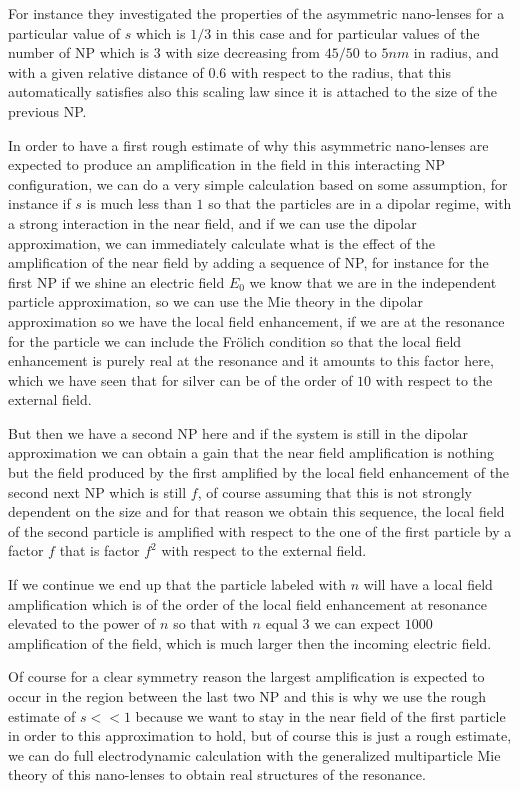 \documentclass[../main/main.tex]{subfiles}
\begin{document}
For instance they investigated the properties of the asymmetric nano-lenses for a particular value of $s$ which is $1/3$ in this case and for particular values of the number of NP which is $3$ with size decreasing from $45/50$ to $5 nm$ in radius, and with a given relative distance of $0.6$ with respect to the radius, that this automatically satisfies also this scaling law since it is attached to the size of the previous NP.

In order to have a first rough estimate of why this asymmetric nano-lenses are expected to produce an amplification in the field in this interacting NP configuration, we can do a very simple calculation based on some assumption, for instance if $s$ is much less than $1$ so that the particles are in a dipolar regime, with a strong interaction in the near field, and if we can use the dipolar approximation, we can immediately calculate what is the effect of the amplification of the near field by adding a sequence of NP, for instance for the first NP if we shine an electric field $E_0$ we know that we are in the independent particle approximation, so we can use the Mie theory in the dipolar approximation so we have the local field enhancement, if we are at the resonance for the particle we can include the Fr\"olich condition so that the local field enhancement is purely real at the resonance and it amounts to this factor here, which we have seen that for silver can be of the order of $10$ with respect to the external field.

But then we have a second NP here and if the system is still in the dipolar approximation we can obtain a gain that the near field amplification is nothing but the field produced by the first amplified by the local field enhancement of the second next NP which is still $f$, of course assuming that this is not strongly dependent on the size and for that reason we obtain this sequence, the local field of the second particle is amplified with respect to the one of the first particle by a factor $f$ that is  factor $f^2$ with respect to the external field.

If we continue we end up that the particle labeled with $n$ will have a local field amplification which is of the order of the local field enhancement at resonance elevated to the power of $n$ so that with $n$ equal $3$ we can expect $1000$ amplification of the field, which is much larger then the incoming electric field.

Of course for a clear symmetry reason the largest amplification is expected to occur in the region between the last two NP and this is why we use the rough estimate of $s<<1$ because we want to stay in the near field of the first particle in order to this approximation to hold, but of course this is just a rough estimate, we can do full electrodynamic calculation with the generalized multiparticle Mie theory of this nano-lenses to obtain real structures of the resonance.
\end{document}
